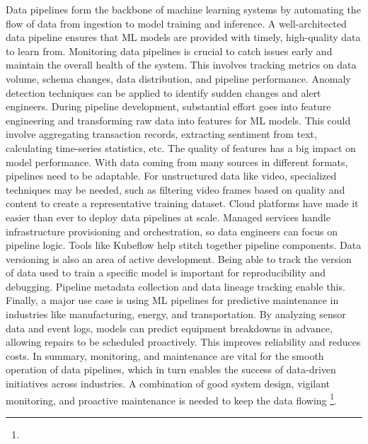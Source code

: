 Data pipelines form the backbone of machine learning systems by automating the flow of data from ingestion to model training and inference. A well-architected data pipeline ensures that ML models are provided with timely, high-quality data to learn from. Monitoring data pipelines is crucial to catch issues early and maintain the overall health of the system. This involves tracking metrics on data volume, schema changes, data distribution, and pipeline performance. Anomaly detection techniques can be applied to identify sudden changes and alert engineers. During pipeline development, substantial effort goes into feature engineering and transforming raw data into features for ML models. This could involve aggregating transaction records, extracting sentiment from text, calculating time-series statistics, etc. The quality of features has a big impact on model performance. With data coming from many sources in different formats, pipelines need to be adaptable. For unstructured data like video, specialized techniques may be needed, such as filtering video frames based on quality and content to create a representative training dataset. Cloud platforms have made it easier than ever to deploy data pipelines at scale. Managed services handle infrastructure provisioning and orchestration, so data engineers can focus on pipeline logic. Tools like Kubeflow help stitch together pipeline components. Data versioning is also an area of active development. Being able to track the version of data used to train a specific model is important for reproducibility and debugging. Pipeline metadata collection and data lineage tracking enable this. Finally, a major use case is using ML pipelines for predictive maintenance in industries like manufacturing, energy, and transportation. By analyzing sensor data and event logs, models can predict equipment breakdowns in advance, allowing repairs to be scheduled proactively. This improves reliability and reduces costs. In summary, monitoring, and maintenance are vital for the smooth operation of data pipelines, which in turn enables the success of data-driven initiatives across industries. A combination of good system design, vigilant monitoring, and proactive maintenance is needed to keep the data flowing \footnote[25]{}.